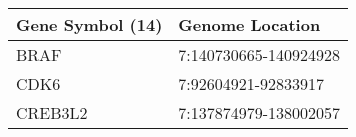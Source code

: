 \begin{tabular}{ll}
\toprule
Gene Symbol (14) &       Genome Location \\
\midrule
            BRAF & 7:140730665-140924928 \\
            CDK6 &   7:92604921-92833917 \\
         CREB3L2 & 7:137874979-138002057 \\
\bottomrule
\end{tabular}
